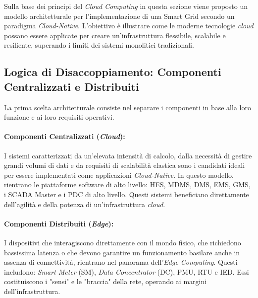


Sulla base dei principi del \textit{Cloud Computing} in questa sezione viene proposto un modello architetturale per l'implementazione di una Smart Grid secondo un paradigma \textit{Cloud-Native}. L'obiettivo è illustrare come le moderne tecnologie \textit{cloud} possano essere applicate per creare un'infrastruttura flessibile, scalabile e resiliente, superando i limiti dei sistemi monolitici tradizionali.

\subsection{Logica di Disaccoppiamento: Componenti Centralizzati e Distribuiti}

La prima scelta architetturale consiste nel separare i componenti in base alla loro funzione e ai loro requisiti operativi.

\paragraph{Componenti Centralizzati (\textit{Cloud}):} I sistemi caratterizzati da un'elevata intensità di calcolo, dalla necessità di gestire grandi volumi di dati e da requisiti di scalabilità elastica sono i candidati ideali per essere implementati come applicazioni \textit{Cloud-Native}. In questo modello, rientrano le piattaforme software di alto livello: HES, MDMS, DMS, EMS, GMS, i SCADA Master e i PDC di alto livello. Questi sistemi beneficiano direttamente dell'agilità e della potenza di un'infrastruttura \textit{cloud}.

\paragraph{Componenti Distribuiti (\textit{Edge}):} I dispositivi che interagiscono direttamente con il mondo fisico, che richiedono bassissima latenza o che devono garantire un funzionamento basilare anche in assenza di connettività, rientrano nel panorama dell'\textit{Edge Computing}. Questi includono: \textit{Smart Meter} (SM), \textit{Data Concentrator} (DC), PMU, RTU e IED. Essi costituiscono i "sensi" e le "braccia" della rete, operando ai margini dell'infrastruttura.





